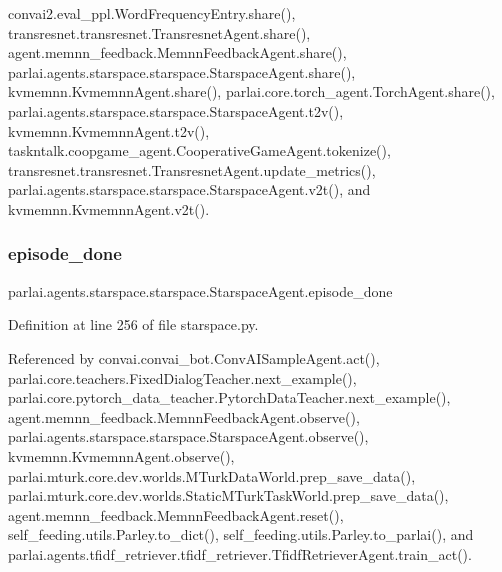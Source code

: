 convai2.\+eval\+\_\+ppl.\+Word\+Frequency\+Entry.\+share(), transresnet.\+transresnet.\+Transresnet\+Agent.\+share(), agent.\+memnn\+\_\+feedback.\+Memnn\+Feedback\+Agent.\+share(), parlai.\+agents.\+starspace.\+starspace.\+Starspace\+Agent.\+share(), kvmemnn.\+Kvmemnn\+Agent.\+share(), parlai.\+core.\+torch\+\_\+agent.\+Torch\+Agent.\+share(), parlai.\+agents.\+starspace.\+starspace.\+Starspace\+Agent.\+t2v(), kvmemnn.\+Kvmemnn\+Agent.\+t2v(), taskntalk.\+coopgame\+\_\+agent.\+Cooperative\+Game\+Agent.\+tokenize(), transresnet.\+transresnet.\+Transresnet\+Agent.\+update\+\_\+metrics(), parlai.\+agents.\+starspace.\+starspace.\+Starspace\+Agent.\+v2t(), and kvmemnn.\+Kvmemnn\+Agent.\+v2t().

\mbox{\label{classparlai_1_1agents_1_1starspace_1_1starspace_1_1StarspaceAgent_ad6565ef570b709afb46bf9a9b4bc59c3}} 
\subsubsection{\texorpdfstring{episode\+\_\+done}{episode\_done}}
{\footnotesize\ttfamily parlai.\+agents.\+starspace.\+starspace.\+Starspace\+Agent.\+episode\+\_\+done}



Definition at line 256 of file starspace.\+py.



Referenced by convai.\+convai\+\_\+bot.\+Conv\+A\+I\+Sample\+Agent.\+act(), parlai.\+core.\+teachers.\+Fixed\+Dialog\+Teacher.\+next\+\_\+example(), parlai.\+core.\+pytorch\+\_\+data\+\_\+teacher.\+Pytorch\+Data\+Teacher.\+next\+\_\+example(), agent.\+memnn\+\_\+feedback.\+Memnn\+Feedback\+Agent.\+observe(), parlai.\+agents.\+starspace.\+starspace.\+Starspace\+Agent.\+observe(), kvmemnn.\+Kvmemnn\+Agent.\+observe(), parlai.\+mturk.\+core.\+dev.\+worlds.\+M\+Turk\+Data\+World.\+prep\+\_\+save\+\_\+data(), parlai.\+mturk.\+core.\+dev.\+worlds.\+Static\+M\+Turk\+Task\+World.\+prep\+\_\+save\+\_\+data(), agent.\+memnn\+\_\+feedback.\+Memnn\+Feedback\+Agent.\+reset(), self\+\_\+feeding.\+utils.\+Parley.\+to\+\_\+dict(), self\+\_\+feeding.\+utils.\+Parley.\+to\+\_\+parlai(), and parlai.\+agents.\+tfidf\+\_\+retriever.\+tfidf\+\_\+retriever.\+Tfidf\+Retriever\+Agent.\+train\+\_\+act().

